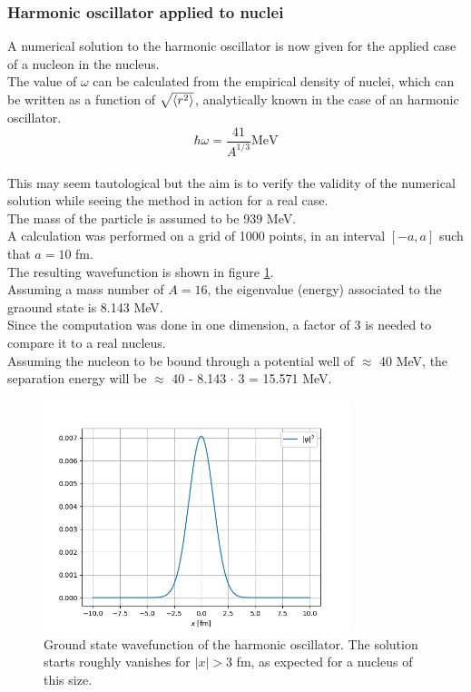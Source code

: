 \documentclass{article}
\begin{document}
\subsubsection{Harmonic oscillator applied to nuclei}
A numerical solution to the harmonic oscillator is now given for the applied case of a nucleon in the nucleus.
\\The value of $\omega$ can be calculated from the empirical density of nuclei, which can be written as a function of $\sqrt{\braket{r^2}}$, analytically known in the case of an harmonic oscillator.
\begin{equation}
    \hbar \omega = \frac{41}{A^{1/3}} \text{MeV}
\end{equation}
\\This may seem tautological but the aim is to verify the validity of the numerical solution while seeing the method in action for a real case.
\\The mass of the particle is assumed to be 939 MeV.
\\A calculation was performed on a grid of 1000 points, in an interval $[-a, a]$ such that $a=10$ fm.
\\The resulting wavefunction is shown in figure \ref{fig:1D_ho}.
\\Assuming a mass number of $A=16$, the eigenvalue (energy) associated to the graound state is 8.143 MeV.
\\Since the computation was done in one dimension, a factor of 3 is needed to compare it to a real nucleus.
\\Assuming the nucleon to be bound through a potential well of $\approx$ 40 MeV, the separation energy will be $\approx$ 40 - 8.143 $\cdot$ 3 = 15.571 MeV.
\begin{figure}[!htb]
\centering
\includegraphics[width=0.8\textwidth]{figures/1D_ho.png}
\caption{\label{fig:1D_ho} Ground state wavefunction of the harmonic oscillator. The solution starts roughly vanishes for $|x|>3$ fm, as expected for a nucleus of this size.}
\end{figure}
\end{document}
